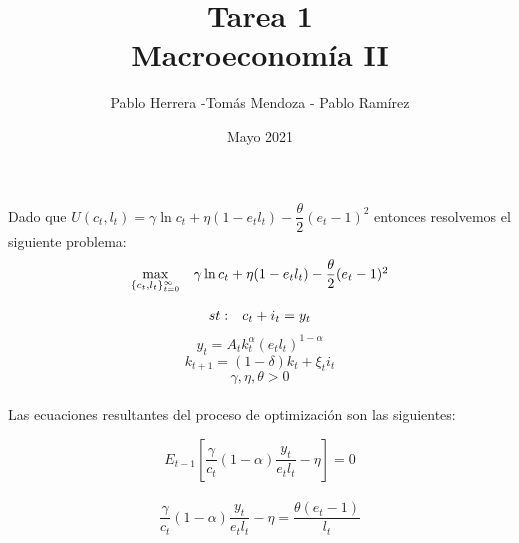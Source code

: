 \documentclass[12pt]{article}
\title{\textbf{Tarea 1} \\Macroeconomía II}
\author{Pablo Herrera -Tomás Mendoza - Pablo Ramírez}
\date{Mayo 2021}
\begin{document}
	
	\maketitle
	

	
		

	
	Dado que  $U(c_t, l_t)=\gamma \ln c_t+\eta(1-e_tl_t)-\dfrac{\theta}{2}(e_t-1)^2 $ entonces resolvemos el siguiente problema:
		\begin{equation}
		\begin{array}{rrclcl}
			\displaystyle \max_{\{c_t,l_t\}_{t=0}^\infty} & \multicolumn{3}{l}{\gamma \ln c_t+\eta(1-e_tl_t)-\dfrac{\theta}{2}(e_t-1)^2}\nonumber\\
			
		\end{array}
	\end{equation} 
	
	\begin{equation}
			\begin{array}{rrclcl}
			\displaystyle st: & \multicolumn{3}{l}{c_{t}+i_{t}=y_{t}}\nonumber\\
					\end{array}
	\end{equation}
			\begin{equation}
	y_t=A_t k_t^\alpha (e_tl_t)^{1-\alpha} \nonumber
		\end{equation}
	\begin{equation}
	k_{t+1}=(1-\delta)k_{t}+\xi_t i_{t}\nonumber
	\end{equation}
		\begin{equation}
			\gamma, \eta, \theta >0\nonumber
		\end{equation} \\
	
	
	
 \newpage Las ecuaciones resultantes del proceso de optimización son las siguientes:	
 


	\begin{equation}
		E_{t-1}[\dfrac{\gamma}{c_t}(1-\alpha)\dfrac{y_t}{e_t l_t}-\eta]=0
	\end{equation}\\

	\begin{equation}
\dfrac{\gamma}{c_t}(1-\alpha)\dfrac{y_t}{e_t l_t}-\eta=\dfrac{\theta(e_t-1)}{l_t}
		\end{equation} \\
	
\end{document}
